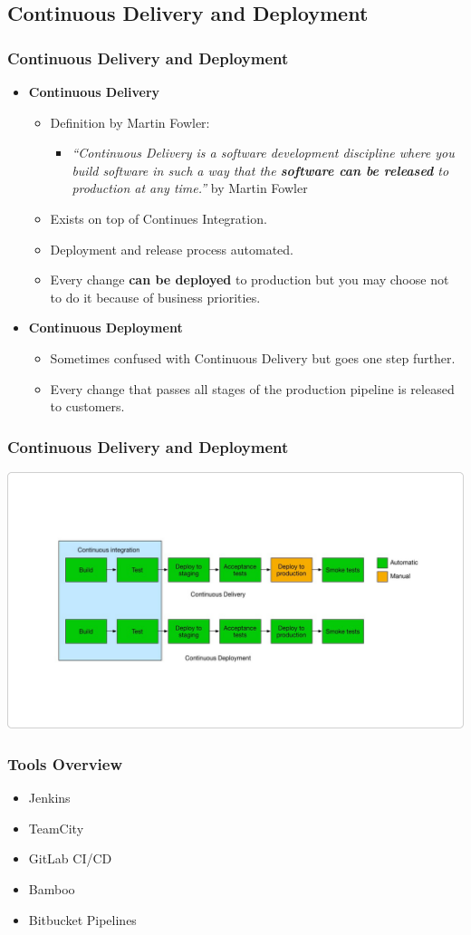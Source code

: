 \subsection[]{Continuous Delivery and Deployment}
\begin{frame}
\frametitle{Continuous Delivery and Deployment}
\begin{itemize}
	\item \textbf{Continuous Delivery}
		\begin{itemize}%
		\item Definition by Martin Fowler:
			\begin{itemize}
			\item \emph{“Continuous Delivery is a software development discipline where you build software in such a way that the \textbf{software can be released} to production at any time.”} by Martin Fowler
			\end{itemize}
		\item Exists on top of Continues Integration.
		\item Deployment and release process automated.
		\item Every change \textbf{can be deployed} to production but you may choose not to do it because of business priorities.
		\end{itemize}
	\item \textbf{Continuous Deployment}
		\begin{itemize}
		\item Sometimes confused with Continuous Delivery but goes one step further.
		\item Every change that passes all stages of the production pipeline is released to customers.
		\end{itemize}
\end{itemize}
\end{frame}

\begin{frame}
\frametitle{Continuous Delivery and Deployment}
\includegraphics[width=\textwidth, height=0.56\textwidth]{cont-delivery-deployment.png}
\end{frame}

\begin{frame}
\frametitle{Tools Overview}
\begin{itemize}
	\item Jenkins
	\item TeamCity
	\item GitLab CI/CD
	\item Bamboo
	\item Bitbucket Pipelines
\end{itemize}
\end{frame}
